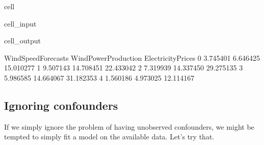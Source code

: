 \documentclass[letterpaper,10pt,english]{jupyterBook}
\begin{document}
\begin{sphinxuseclass}{cell}
\begin{sphinxVerbatimInput}
\begin{sphinxuseclass}{cell_input}
\begin{sphinxVerbatim}[commandchars=\\\{\}]
\end{sphinxVerbatim}

\end{sphinxuseclass}\end{sphinxVerbatimInput}
\begin{sphinxVerbatimOutput}

\begin{sphinxuseclass}{cell_output}
\begin{sphinxVerbatim}[commandchars=\\\{\}]
   WindSpeedForecasts  WindPowerProduction  ElectricityPrices
0            3.745401             6.646425          15.010277
1            9.507143            14.708451          22.433042
2            7.319939            14.337450          29.275135
3            5.986585            14.664067          31.182353
4            1.560186             4.973025          12.114167
\end{sphinxVerbatim}

\end{sphinxuseclass}\end{sphinxVerbatimOutput}

\end{sphinxuseclass}

\subsection{Ignoring confounders}
\label{\detokenize{notebooks/instrumental_variables:ignoring-confounders}}
\sphinxAtStartPar
If we simply ignore the problem of having unobserved confounders, we might be tempted to simply fit a model on the available data. Let’s try that.
\end{document}
